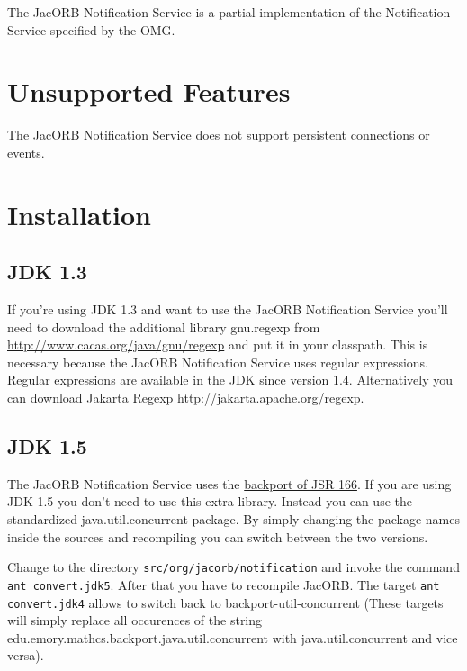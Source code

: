 %
%

The JacORB Notification Service is a partial implementation of
the Notification Service specified by the OMG.

\section{Unsupported Features}

The JacORB Notification Service does not support persistent connections or events.

\section{Installation}
\label{sec:installation}

\subsection{JDK 1.3}

If you're using JDK 1.3 and want to use the JacORB Notification
Service you'll need 
to download the additional library gnu.regexp from 
\href{http://www.cacas.org/java/gnu/regexp}{http://www.cacas.org/java/gnu/regexp}
and put it in your classpath. This is necessary because the JacORB
Notification Service uses regular expressions. Regular expressions are available in the JDK since version 1.4. Alternatively
you can download Jakarta Regexp \href{http://jakarta.apache.org/regexp}{http://jakarta.apache.org/regexp}.

\subsection{JDK 1.5}

The JacORB Notification Service uses the \href{http://www.mathcs.emory.edu/dcl/util/backport-util-concurrent/}{backport of JSR 166}. If you are using JDK 1.5 you don't need to use this extra library. Instead you can use the standardized java.util.concurrent package. By simply changing the package names inside the
sources and recompiling you can switch between the two versions.

Change to the directory \texttt{src/org/jacorb/notification} and invoke the command \texttt{ant convert.jdk5}. After that you have to recompile JacORB. The target \texttt{ant convert.jdk4} allows to switch back to backport-util-concurrent (These targets will simply replace all occurences of the string edu.emory.mathcs.backport.java.util.concurrent with java.util.concurrent and vice versa).
 
